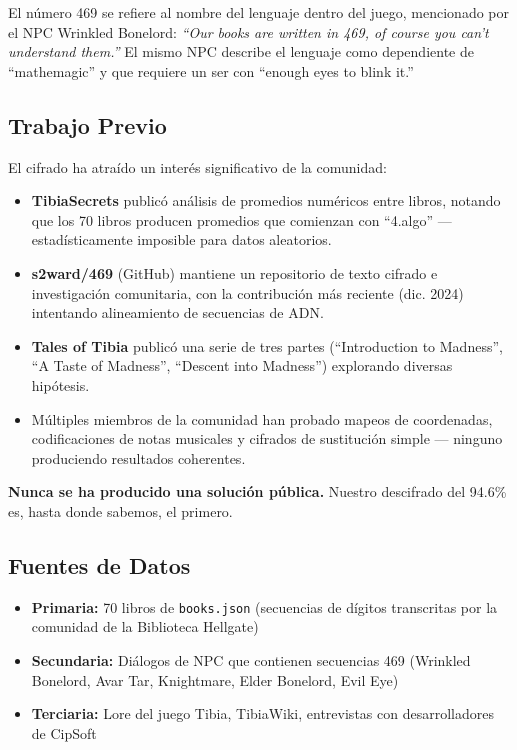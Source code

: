 \documentclass[11pt,a4paper]{article}
\begin{document}
El n\'{u}mero 469 se refiere al nombre del lenguaje dentro del juego, mencionado por el NPC Wrinkled Bonelord: \textit{``Our books are written in 469, of course you can't understand them.''} El mismo NPC describe el lenguaje como dependiente de ``mathemagic'' y que requiere un ser con ``enough eyes to blink it.''

\subsection{Trabajo Previo}

El cifrado ha atra\'{i}do un inter\'{e}s significativo de la comunidad:

\begin{itemize}
\item \textbf{TibiaSecrets} public\'{o} an\'{a}lisis de promedios num\'{e}ricos entre libros, notando que los 70 libros producen promedios que comienzan con ``4.algo'' --- estad\'{i}sticamente imposible para datos aleatorios.
\item \textbf{s2ward/469} (GitHub) mantiene un repositorio de texto cifrado e investigaci\'{o}n comunitaria, con la contribuci\'{o}n m\'{a}s reciente (dic. 2024) intentando alineamiento de secuencias de ADN.
\item \textbf{Tales of Tibia} public\'{o} una serie de tres partes (``Introduction to Madness'', ``A Taste of Madness'', ``Descent into Madness'') explorando diversas hip\'{o}tesis.
\item M\'{u}ltiples miembros de la comunidad han probado mapeos de coordenadas, codificaciones de notas musicales y cifrados de sustituci\'{o}n simple --- ninguno produciendo resultados coherentes.
\end{itemize}

\textbf{Nunca se ha producido una soluci\'{o}n p\'{u}blica.} Nuestro descifrado del 94.6\% es, hasta donde sabemos, el primero.

\subsection{Fuentes de Datos}

\begin{itemize}
\item \textbf{Primaria:} 70 libros de \texttt{books.json} (secuencias de d\'{i}gitos transcritas por la comunidad de la Biblioteca Hellgate)
\item \textbf{Secundaria:} Di\'{a}logos de NPC que contienen secuencias 469 (Wrinkled Bonelord, Avar Tar, Knightmare, Elder Bonelord, Evil Eye)
\item \textbf{Terciaria:} Lore del juego Tibia, TibiaWiki, entrevistas con desarrolladores de CipSoft
\end{itemize}
\end{document}
